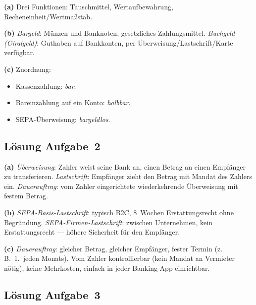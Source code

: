 \documentclass[11pt, a4paper]{article}
\begin{document}
\begin{loesung}
\textbf{(a)} Drei Funktionen: Tauschmittel, Wertaufbewahrung, Recheneinheit/Wertmaßstab.

\textbf{(b)} \emph{Bargeld}: Münzen und Banknoten, gesetzliches Zahlungsmittel.
\emph{Buchgeld (Giralgeld)}: Guthaben auf Bankkonten, per Überweisung/Lastschrift/Karte verfügbar.

\textbf{(c)} Zuordnung:
\begin{itemize}[itemsep=0pt]
  \item Kassenzahlung: \emph{bar}.
  \item Bareinzahlung auf ein Konto: \emph{halbbar}.
  \item SEPA-Überweisung: \emph{bargeldlos}.
\end{itemize}
\end{loesung}

\subsection*{Lösung Aufgabe~2}

\begin{loesung}
\textbf{(a)} \emph{Überweisung}: Zahler weist seine Bank an, einen Betrag an einen Empfänger
zu transferieren. \emph{Lastschrift}: Empfänger zieht den Betrag mit Mandat des Zahlers
ein. \emph{Dauerauftrag}: vom Zahler eingerichtete wiederkehrende Überweisung mit festem
Betrag.

\textbf{(b)} \emph{SEPA-Basis-Lastschrift}: typisch B2C, 8~Wochen Erstattungsrecht ohne
Begründung. \emph{SEPA-Firmen-Lastschrift}: zwischen Unternehmen, kein Erstattungsrecht
--- höhere Sicherheit für den Empfänger.

\textbf{(c)} \emph{Dauerauftrag}: gleicher Betrag, gleicher Empfänger, fester Termin
(z.\,B.\ 1.\ jeden Monats). Vom Zahler kontrollierbar (kein Mandat an Vermieter
nötig), keine Mehrkosten, einfach in jeder Banking-App einrichtbar.
\end{loesung}

\subsection*{Lösung Aufgabe~3}
\end{document}
